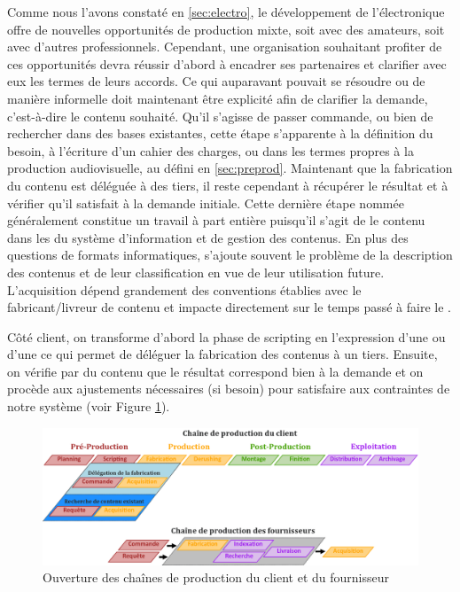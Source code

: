 Comme nous l'avons constaté en \ref{sec:electro}, le développement de l'électronique offre de nouvelles opportunités de production mixte, soit avec des amateurs, soit avec d'autres professionnels. 
Cependant, une organisation souhaitant profiter de ces opportunités devra réussir d'abord à encadrer ses partenaires et clarifier avec eux les termes de leurs accords. 
Ce qui auparavant pouvait se résoudre  ou de manière informelle doit maintenant être explicité afin de clarifier la demande, c'est-à-dire le contenu souhaité. 
Qu'il s'agisse de passer commande, ou bien de rechercher dans des bases existantes, cette étape s'apparente à la définition du besoin, à l'écriture d'un cahier des charges, ou dans les termes propres à la production audiovisuelle, au  défini en \ref{sec:preprod}. 
Maintenant que la fabrication du contenu est déléguée à des tiers, il reste cependant à récupérer le résultat et à vérifier qu'il satisfait à la demande initiale. 
Cette dernière étape nommée généralement  constitue un travail à part entière puisqu'il s'agit de  le contenu dans les  du système d'information et de gestion des contenus. 
En plus des questions de formats informatiques, s'ajoute souvent le problème de la description des contenus et de leur classification en vue de leur utilisation future.  
L'acquisition dépend grandement des conventions établies avec le fabricant/livreur de contenu et impacte directement sur le temps passé à faire le . 

Côté client, on transforme d'abord la phase de scripting en l'expression d'une  ou d'une  ce qui permet de déléguer la fabrication des contenus à un tiers.
Ensuite, on vérifie par  du contenu que le résultat correspond bien à la demande et on procède aux ajustements nécessaires (si besoin) pour satisfaire aux contraintes de notre système (voir Figure \ref{img:intro:evochain}). 

\begin{figure}[ht!]
\centering
\includegraphics[width=\textwidth]{images/Workflow-Thesis-v6.png}
\caption{Ouverture des chaînes de production du client et du fournisseur}
\label{img:intro:evochain}
\end{figure}

